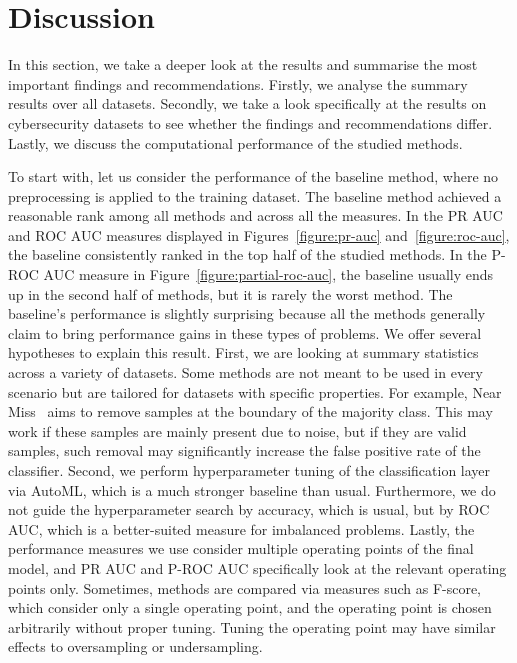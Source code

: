 \documentclass[conference]{IEEEtran}
\begin{document}
\section{Discussion}
\label{section:discussion}

In this section, we take a deeper look at the results and summarise the most important findings and
recommendations. Firstly, we analyse the summary results over all datasets. Secondly, we take a
look specifically at the results on cybersecurity datasets to see whether the findings and
recommendations differ. Lastly, we discuss the computational performance of the studied methods.

To start with, let us consider the performance of the baseline method, where no preprocessing is
applied to the training dataset. The baseline method achieved a reasonable rank among all methods
and across all the measures. In the PR AUC and ROC AUC measures displayed in
Figures~\ref{figure:pr-auc} and~\ref{figure:roc-auc}, the baseline consistently ranked in the top
half of the studied methods. In the P-ROC AUC measure in Figure~\ref{figure:partial-roc-auc}, the
baseline usually ends up in the second half of methods, but it is rarely the worst method. The
baseline's performance is slightly surprising because all the methods generally claim to bring
performance gains in these types of problems. We offer several hypotheses to explain this result.
First, we are looking at summary statistics across a variety of datasets. Some methods are not
meant to be used in every scenario but are tailored for datasets with specific properties. For
example, Near Miss~\cite{mani2003} aims to remove samples at the boundary of the majority class.
This may work if these samples are mainly present due to noise, but if they are valid samples, such
removal may significantly increase the false positive rate of the classifier. Second, we perform
hyperparameter tuning of the classification layer via AutoML, which is a much stronger baseline
than usual. Furthermore, we do not guide the hyperparameter search by accuracy, which is usual, but
by ROC AUC, which is a better-suited measure for imbalanced problems. Lastly, the performance
measures we use consider multiple operating points of the final model, and PR AUC and P-ROC AUC
specifically look at the relevant operating points only. Sometimes, methods are compared via
measures such as F-score, which consider only a single operating point, and the operating point is
chosen arbitrarily without proper tuning. Tuning the operating point may have similar effects to
oversampling or undersampling.
\end{document}
